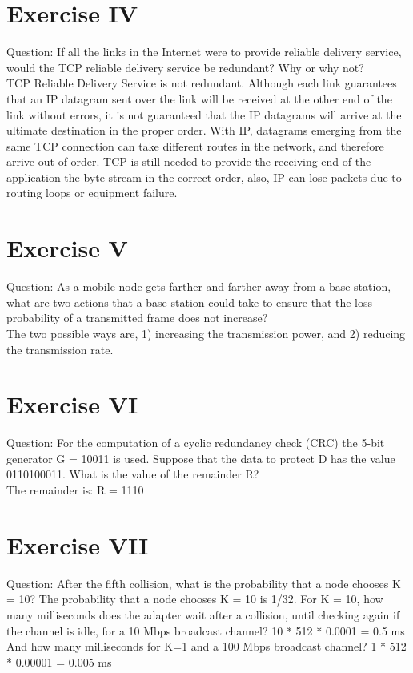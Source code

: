 \documentclass[11pt]{article}
\begin{document}
	\section*{Exercise IV}
	Question: If all the links in the Internet were to provide reliable delivery service, would the TCP reliable delivery service be redundant? Why or why not?\\
	\linebreak
	TCP Reliable Delivery Service is not redundant. Although each link guarantees that an IP datagram sent over the link will be received at the other end of the link without errors, it is not guaranteed that the IP datagrams will arrive at the ultimate destination in the proper order. With IP, datagrams emerging from the same TCP connection can take different routes in the network, and therefore arrive out of order. TCP is still needed to provide the receiving end of the application the byte stream in the correct order, also, IP can lose packets due to routing loops or equipment failure.

	\section*{Exercise V}
	Question:
	As a mobile node gets farther and farther away from a base station, what are two actions that a base station could take to ensure that the loss probability of a transmitted frame does not increase?\\
  \linebreak
	The two possible ways are, 1) increasing the transmission power, and 2) reducing the transmission rate.
	\section*{Exercise VI}
	Question:
	For the computation of a cyclic redundancy check (CRC) the 5-bit generator G = 10011 is used. Suppose that the data to protect D has the value 0110100011. What is the value of the remainder R?\\
    \linebreak
	The remainder is: R = 1110
	\section*{Exercise VII}
	Question:
	After the fifth collision, what is the probability that a node chooses K = 10?
	The probability that a node chooses K = 10 is 1/32.
	\linebreak
	For K = 10, how many milliseconds does the adapter wait after a collision, until checking again if the channel is idle, for a 10 Mbps broadcast channel?
	10 * 512 * 0.0001 = 0.5 ms
	\linebreak
	And how many milliseconds for K=1 and a 100 Mbps broadcast channel?
	1 * 512 * 0.00001 = 0.005 ms
\end{document}
